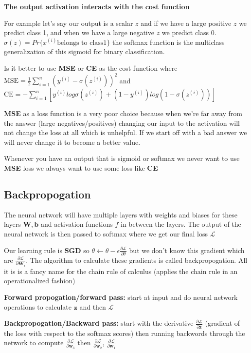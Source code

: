 \documentclass[twocolumn, letter, 10pt, landscape]{article}
\newcommand{\mb}{\mathbf}
\newcommand{\tb}{\textbf}
\begin{document}
\tb{The output activation interacts with the cost function}

For example let's say our output is a scalar $z$ and if we have a large positive $z$ we predict class 1, and when we have a large negative $z$ we predict class 0. $\sigma(z) = Pr\{x^{(i)} \text{belongs to class} 1\}$ the softmax function is the multiclass generalization of this sigmoid for binary classification.

Is it better to use \tb{MSE} or \tb{CE} as the cost function where $\text{MSE} = \frac{1}{2}\sum_{i=1}^n(y^{(i)}-\sigma(z^{(i)}))^2$ and $\text{CE} = -\sum_{i=1}^n[y^{(i)}log \sigma(z^{(i)})+(1-y^{(i)})log(1-\sigma(z^{(i)}))]$

\tb{MSE} as a loss function is a very poor choice because when we're far away from the answer (large negatives/positives) changing our input to the activation will not change the loss at all which is unhelpful. If we start off with a bad answer we will never change it to become a better value.

Whenever you have an output that is sigmoid or softmax we never want to use \tb{MSE} loss we always want to use some loss like \tb{CE}

\subsection{Backpropogation}
The neural network will have multiple layers with weights and biases for these layers $\mb{W},\mb{b}$ and activation functions $f$ in between the layers. The output of the neural network is then passed to softmax where we get our final loss $\mathcal{L}$

Our learning rule is \tb{SGD} so $\theta\leftarrow \theta-\epsilon\frac{\partial \mathcal{L}}{\partial \theta}$ but we don't know this gradient which are $\frac{\partial \mathcal{L}}{\partial \mb{W}_i}$. The algorithm to calculate these gradients is called backpropogation. All it is is a fancy name for the chain rule of calculus (applies the chain rule in an operationalized fashion)

\tb{Forward propogation/forward pass:} start at input and do neural network operations to calculate $\mb{z}$ and then $\mathcal{L}$

\tb{Backpropogation/Backward pass:} start with the derivative $\frac{\partial\mathcal{L}}{\partial\mb{z}}$ (gradient of the loss with respect to the softmax scores) then running backwords through the network to compute $\frac{\partial \mathcal{L}}{\partial \mb{w}_3}$ then $\frac{\partial \mathcal{L}}{\partial \mb{w}_2}$, $\frac{\partial \mathcal{L}}{\partial \mb{w}_1}$
\end{document}
